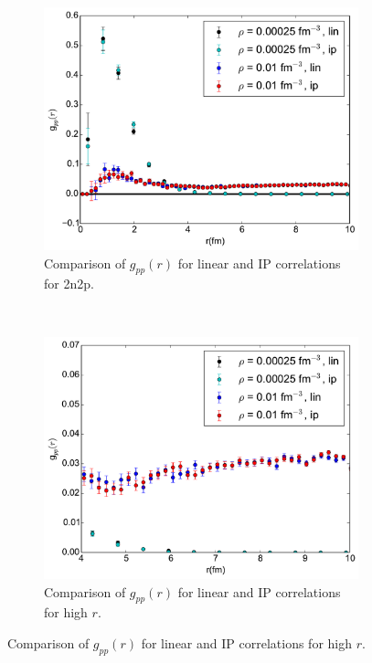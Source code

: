 \documentclass[12pt]{article}
\begin{document}
\begin{figure}[h!]
\begin{subfigure}{0.49\textwidth}
      \includegraphics[width=\textwidth]{../gpp_linVSip_alpha.pdf}
      \caption{Comparison of $g_{pp}(r)$ for linear and IP correlations for 2n2p.}
   \end{subfigure}
   ~
   \begin{subfigure}{0.49\textwidth}
      \includegraphics[width=\textwidth]{../gpp_linVSip_small_alpha.pdf}
      \caption{Comparison of $g_{pp}(r)$ for linear and IP correlations for high $r$.}
   \end{subfigure}
\end{figure}
\newpage
\end{document}
